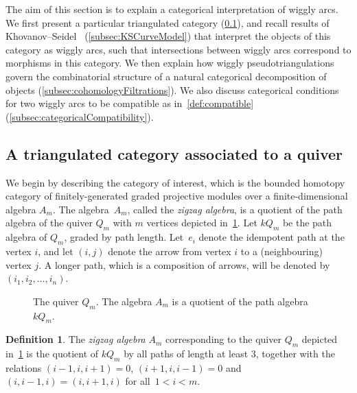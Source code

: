 \documentclass{amsart}
\theoremstyle{definition}
\newtheorem{definition}[theorem]{Definition}
\newcommand{\darkblue}{\color{darkblue}} %
\newcommand{\defn}[1]{\textsl{\darkblue #1}} %
\begin{document}
The aim of this section is to explain a categorical interpretation of wiggly arcs.
We first present a particular triangulated category (\cref{subsec:category}), and recall results of Khovanov--Seidel~\cite{kho.sei:02} (\cref{subsec:KSCurveModel}) that interpret the objects of this category as wiggly arcs, such that intersections between wiggly arcs correspond to morphisms in this category.
We then explain how wiggly pseudotriangulations govern the combinatorial structure of a natural categorical decomposition of objects (\cref{subsec:cohomologyFiltrations}).
We also discuss categorical conditions for two wiggly arcs to be compatible as in~\cref{def:compatible} (\cref{subsec:categoricalCompatibility}).


\subsection{A triangulated category associated to a quiver}
\label{subsec:category}

We begin by describing the category of interest, which is the bounded homotopy category of finitely-generated graded projective modules over a finite-dimensional algebra \(A_m\). 
The algebra~\(A_m\), called the \defn{zigzag algebra}, is a quotient of the path algebra of the quiver \(Q_m\) with \(m\) vertices depicted in~\cref{fig:am-quiver}.
Let \(kQ_m\) be the path algebra of \(Q_m\), graded by path length.
Let~\(e_i\) denote the idempotent path at the vertex \(i\), and let \((i, j)\) denote the arrow from vertex \(i\) to a (neighbouring) vertex \(j\).
A longer path, which is a composition of arrows, will be denoted by~\((i_1, i_2, \dots, i_n)\).

\begin{figure}[h]
	\centering
	\caption{The quiver \(Q_m\). The algebra \(A_m\) is a quotient of the path algebra \(kQ_m\).}
	\label{fig:am-quiver}
\end{figure}

\begin{definition}
The \defn{zigzag algebra} \(A_m\) corresponding to the quiver \(Q_m\) depicted in~\cref{fig:am-quiver} is the quotient of \(kQ_m\) by all paths of length at least \(3\), together with the relations \((i-1, i, i+1) = 0\), \((i+1, i, i-1)=0\) and \((i, i-1, i) = (i, i+1, i)\) for all~\(1 < i < m\).
\end{definition}
\end{document}
